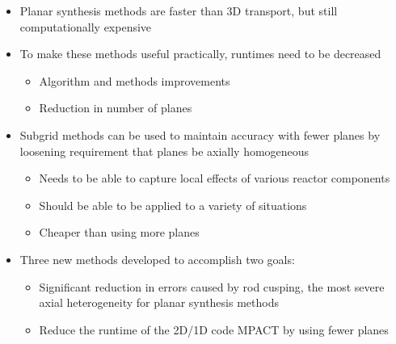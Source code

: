 \begin{frame}
    
    \begin{itemize}
        \item Planar synthesis methods are faster than 3D transport, but still computationally expensive
        \item To make these methods useful practically, runtimes need to be decreased
        \begin{itemize}
            \item Algorithm and methods improvements
            \item Reduction in number of planes
        \end{itemize}
        \item Subgrid methods can be used to maintain accuracy with fewer planes by loosening requirement that planes be axially homogeneous
        \begin{itemize}
            \item Needs to be able to capture local effects of various reactor components
            \item Should be able to be applied to a variety of situations
            \item Cheaper than using more planes
        \end{itemize}
        \item Three new methods developed to accomplish two goals:
        \begin{itemize}
            \item Significant reduction in errors caused by rod cusping, the most severe axial heterogeneity for planar synthesis methods
            \item Reduce the runtime of the 2D/1D code MPACT by using fewer planes
        \end{itemize}
    \end{itemize}

\end{frame}